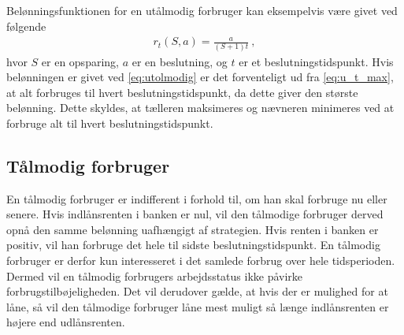 

Belønningsfunktionen for en utålmodig forbruger kan eksempelvis være givet ved følgende
\begin{align}\label{eq:utolmodig}
    r_t(S, a) = \frac{a}{(S+1)t} \ ,
\end{align}
hvor $S$ er en opsparing, $a$ er en beslutning, og $t$ er et beslutningstidspunkt. Hvis belønningen er givet ved \eqref{eq:utolmodig} er det forventeligt ud fra \eqref{eq:u_t_max}, at alt forbruges til hvert beslutningstidspunkt, da dette giver den største belønning. Dette skyldes, at tælleren maksimeres og nævneren minimeres ved at forbruge alt til hvert beslutningstidspunkt. 




\subsection{Tålmodig forbruger}
En tålmodig forbruger er indifferent i forhold til, om han skal forbruge nu eller senere. Hvis indlånsrenten i banken er nul, vil den tålmodige forbruger derved opnå den samme belønning uafhængigt af strategien. Hvis renten i banken er positiv, vil han forbruge det hele til sidste beslutningstidspunkt. En tålmodig forbruger er derfor kun interesseret i det samlede forbrug over hele tidsperioden. Dermed vil en tålmodig forbrugers arbejdsstatus ikke påvirke forbrugstilbøjeligheden. Det vil derudover gælde, at hvis der er mulighed for at låne, så vil den tålmodige forbruger låne mest muligt så længe indlånsrenten er højere end udlånsrenten. 

